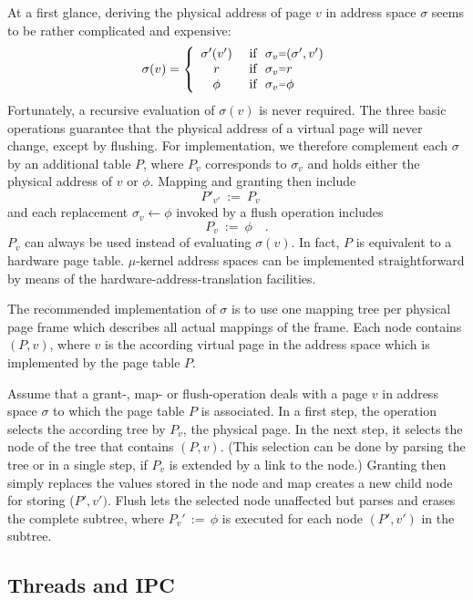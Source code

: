 \documentclass[a4paper,11pt,twoside,dvips]{book}
\newcommand{\micro}{$\mu$}
\newcommand{\smaller}[1]{{\mathchoice 
           {\raisebox{1pt}{$\scriptstyle #1$}} 
           {\raisebox{1pt}{$\scriptstyle #1$}} 
           {\raisebox{0.5pt}{$\scriptscriptstyle #1$}} 
           {\raisebox{0.5pt}{$\scriptscriptstyle #1$}} 
}}
\newcommand{\EQ}{\smaller{=}}
\newcommand{\repl}{\leftarrow}
\newcommand{\PT}{P}
\begin{document}
At a first glance, deriving the physical address of page $v$ in address space
$\sigma$ seems to be rather complicated and expensive: 
% 
\[   \sigma(v) = \left\{\begin{array}{cl} 
% 
                   \sigma'(v')   & \mbox{~if~}\ \sigma_v \EQ (\sigma',v') \\ 
                   r             & \mbox{~if~}\ \sigma_v \EQ r            \\ 
                   \phi          & \mbox{~if~}\ \sigma_v \EQ \phi 
% 
                 \end{array}\right. \] 
% 
Fortunately, a recursive evaluation of $\sigma(v)$ is never required. The
three basic operations guarantee that the physical address of a virtual page
will never change, except by flushing. For implementation, we therefore
complement each $\sigma$ by an additional table $\PT$, where $\PT_v$
corresponds to $\sigma_v$ and holds either the physical address of $v$
or $\phi$. Mapping and granting then include 
% 
\[    \PT'_{v'}\ :=\ \PT_v  \quad \] 
% 
and each replacement $\sigma_v \repl \phi$ invoked by a flush operation
includes 
% 
\[    \PT_{v}\ :=\ \phi  \quad . \] 
% 
$\PT_v$ can always be used instead of evaluating $\sigma(v)$.
In fact, $\PT$ is equivalent to a hardware page table. \micro-kernel
address spaces can be implemented straightforward by means of
the hardware-address-translation facilities. 
 
The recommended implementation of $\sigma$ is to use one mapping tree per
physical page frame which describes all actual mappings of the frame.
Each node contains $(\PT,v)$, where $v$ is the according virtual page in
the address space which is implemented by the page table $\PT$. 
 
Assume that a grant-, map- or flush-operation deals with a page $v$
in address space $\sigma$ to which the page table $\PT$ is associated. In a
first step, the operation selects the according tree by $\PT_v$, the
physical page. In the next step, it selects the node of the tree that
contains $(\PT,v)$. (This selection can be done by parsing the tree or in
a single step, if $\PT_v$ is extended by a link to the node.) Granting then
simply replaces the values stored in the node and map creates a new child
node for storing ($\PT',v')$. Flush lets the selected node unaffected but
parses and erases the complete subtree, where $\PT_v'\,:=\,\phi$ is
executed for each node $(\PT',v')$ in the subtree. 
 
 
 
 
\subsection{Threads and IPC} 
 
\end{document}

